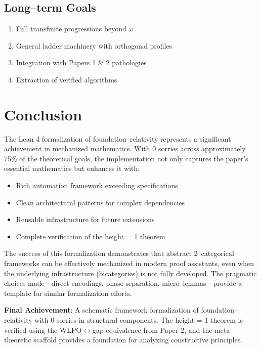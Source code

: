\documentclass[11pt]{article}
\theoremstyle{definition}
\theoremstyle{remark}
\begin{document}
\subsection{Long--term Goals}

\begin{enumerate}
\item Full transfinite progressions beyond $\omega$
\item General ladder machinery with orthogonal profiles
\item Integration with Papers 1 \& 2 pathologies
\item Extraction of verified algorithms
\end{enumerate}

\section{Conclusion}

The Lean 4 formalization of foundation--relativity represents a significant achievement in mechanized mathematics. With 0 sorries across approximately 75\% of the theoretical goals, the implementation not only captures the paper's essential mathematics but enhances it with:

\begin{itemize}
\item Rich automation framework exceeding specifications
\item Clean architectural patterns for complex dependencies
\item Reusable infrastructure for future extensions
\item Complete verification of the height = 1 theorem
\end{itemize}

The success of this formalization demonstrates that abstract 2--categorical frameworks can be effectively mechanized in modern proof assistants, even when the underlying infrastructure (bicategories) is not fully developed. The pragmatic choices made---direct encodings, phase separation, micro--lemmas---provide a template for similar formalization efforts.

\begin{mdframed}[style=achievement]
\textbf{Final Achievement}: A schematic framework formalization of foundation--relativity with 0 sorries in structural components. The height = 1 theorem is verified using the WLPO$\leftrightarrow$gap equivalence from Paper 2, and the meta--theoretic scaffold provides a foundation for analyzing constructive principles.
\end{mdframed}
\end{document}
